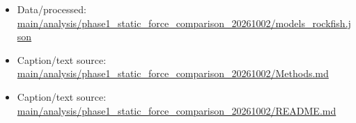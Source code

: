 \begin{itemize}[leftmargin=1.4em,noitemsep]
\item Data/processed: \begingroup\scriptsize\url{main/analysis/phase1_static_force_comparison_20261002/models_rockfish.json}\endgroup
\item Caption/text source: \begingroup\scriptsize\url{main/analysis/phase1_static_force_comparison_20261002/Methods.md}\endgroup
\item Caption/text source: \begingroup\scriptsize\url{main/analysis/phase1_static_force_comparison_20261002/README.md}\endgroup
\end{itemize}
